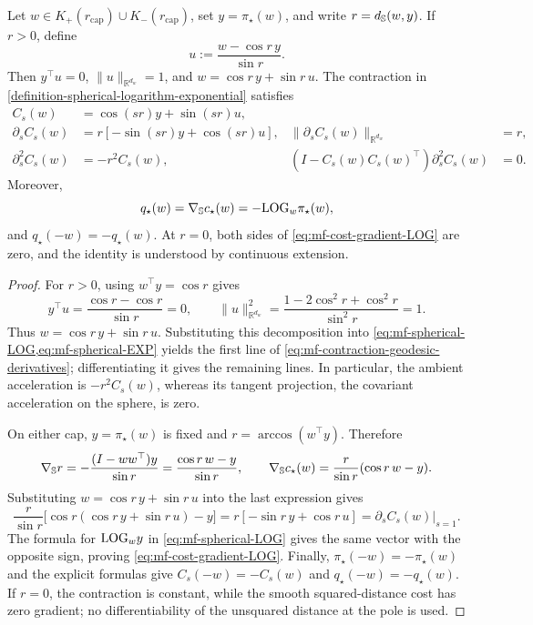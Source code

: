 \begin{lemma}
\label{lem:fixed-assignment-contraction-geometry}
Let \(w\in K_+(r_{\mathrm{cap}})\cup K_-(r_{\mathrm{cap}})\), set
\(y=\pi_\star(w)\), and write \(r=d_{\mathbb{S}}(w,y)\).  If \(r>0\), define
\[
 u:=\frac{w-\cos r\,y}{\sin r}.
\]
Then \(y^\top u=0\), \(\|u\|_{\mathbb R^{d_w}}=1\), and
\(w=\cos r\,y+\sin r\,u\).  The contraction in
\cref{definition-spherical-logarithm-exponential} satisfies
\begin{equation}
\label{eq:mf-contraction-geodesic-derivatives}
\begin{aligned}
 C_s(w)&=\cos(sr)y+\sin(sr)u,\\
 \partial_s C_s(w)&=r[-\sin(sr)y+\cos(sr)u],
 &\|\partial_s C_s(w)\|_{\mathbb R^{d_w}}&=r,\\
 \partial_s^2 C_s(w)&=-r^2C_s(w),
 &(I-C_s(w)C_s(w)^\top)\partial_s^2 C_s(w)&=0.
\end{aligned}
\end{equation}
Moreover,
\begin{equation}
\label{eq:mf-cost-gradient-LOG}
 q_\star(w)=\nabla_{\mathbb{S}} c_\star(w)=-\mathrm{LOG}_w\pi_\star(w),
\end{equation}
and \(q_\star(-w)=-q_\star(w)\).  At \(r=0\), both sides of
\cref{eq:mf-cost-gradient-LOG} are zero, and the identity is understood by
continuous extension.
\end{lemma}

\begin{proof}
For \(r>0\), using \(w^\top y=\cos r\) gives
\[
 y^\top u=\frac{\cos r-\cos r}{\sin r}=0,
 \qquad
 \|u\|_{\mathbb R^{d_w}}^2
 =\frac{1-2\cos^2r+\cos^2r}{\sin^2r}=1.
\]
Thus \(w=\cos r\,y+\sin r\,u\).  Substituting this decomposition into
\cref{eq:mf-spherical-LOG,eq:mf-spherical-EXP} yields the first line of
\cref{eq:mf-contraction-geodesic-derivatives}; differentiating it gives the
remaining lines.  In particular, the ambient acceleration is
\(-r^2C_s(w)\), whereas its tangent projection, the covariant acceleration
on the sphere, is zero.

On either cap, \(y=\pi_\star(w)\) is fixed and
\(r=\arccos(w^\top y)\).  Therefore
\[
 \nabla_{\mathbb{S}} r
 =-\frac{(I-ww^\top)y}{\sin r}
 =\frac{\cos r\,w-y}{\sin r},
 \qquad
 \nabla_{\mathbb{S}} c_\star(w)
 =\frac r{\sin r}(\cos r\,w-y).
\]
Substituting \(w=\cos r\,y+\sin r\,u\) into the last expression gives
\[
 \frac r{\sin r}\bigl[\cos r(\cos r\,y+\sin r\,u)-y\bigr]
 =r[-\sin r\,y+\cos r\,u]
 =\left.\partial_sC_s(w)\right|_{s=1}.
\]
The formula for \(\mathrm{LOG}_wy\) in \cref{eq:mf-spherical-LOG} gives the same
vector with the opposite sign, proving \cref{eq:mf-cost-gradient-LOG}.
Finally, \(\pi_\star(-w)=-\pi_\star(w)\) and the explicit formulas give
\(C_s(-w)=-C_s(w)\) and \(q_\star(-w)=-q_\star(w)\).  If \(r=0\), the
contraction is constant, while the smooth squared-distance cost has zero
gradient; no differentiability of the unsquared distance at the pole is used.
\end{proof}

